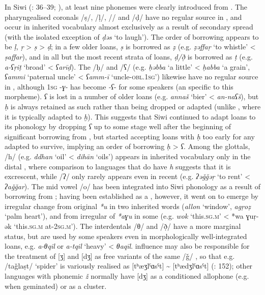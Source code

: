 \documentclass[output=paper]{langsci/langscibook}
\begin{document}
In Siwi (\citealt{Souag2013book}: 36–39; \citealt{SouagvanPutten2016}), at least nine phonemes were clearly introduced from .  The pharyngealised coronals /ṣ/, /ḷ/, /\R/ and /ḍ/ have no regular source in , and occur in inherited vocabulary almost exclusively as a result of secondary  spread (with the isolated exception of \textit{ḍəs} `to laugh').  The order of borrowing appears to be \textit{ḷ,} \textit{ṛ} > \textit{ṣ} > \textit{ḍ}; in a few older loans,  \textit{ṣ} is borrowed as \textit{ẓ} (e.g. \textit{ẓəffaṛ} `to whistle' < \textit{ṣaffar}), and in all but the most recent strata of loans,  \textit{ḍ/ð̣} is borrowed as \textit{ṭ} (e.g. \textit{a-ʕṛiṭ} `broad' < \textit{ʕarīḍ}).  The  /ḥ/ and /ʕ/ (e.g. \textit{ḥəbba} `a little' < \textit{ḥabba} `a grain', \textit{ʕammi} `paternal uncle' < \textit{ʕamm-ī} `uncle-\textsc{obl.1sg}') likewise have no regular source in , although 1\textsc{sg} -\textit{ɣ}{}- has become \textit{{}-ʕ}{}- for some speakers (an  specific to this morpheme). \textit{ʕ} is lost in a number of older loans (e.g. \textit{annaš} `bier' < \textit{an-naʕš}), but \textit{ḥ} is always retained as such rather than being dropped or adapted (unlike , where it is typically adapted to \textit{ḫ}).  This suggests that Siwi continued to adapt  loans to its phonology by dropping \textit{ʕ} up to some stage well after the beginning of significant borrowing from , but started accepting  loans with \textit{ḥ} too early for any adapted to survive, implying an order of borrowing \textit{ḥ} > \textit{ʕ}. Among the glottals, /h/ (e.g. \textit{ddhan} `oil' < \textit{dihān} `oils') appears in inherited vocabulary only in the distal , where comparison to  languages that do have \textit{h} suggests that it is excrescent, while /ʔ/ only rarely appears even in recent  (e.g. \textit{ʔəǧǧəṛ} `to rent' < \textit{ʔaǧǧar}). The mid vowel /o/ has been integrated into Siwi phonology as a result of borrowing from ; having been established as a , however, it went on to emerge by irregular change from original \textit{*u} in two inherited words (\textit{allon} `window', \textit{agṛoẓ} `palm heart'), and from irregular  of \textit{*aɣu} in some  (e.g. \textit{wok} `this\textsc{.sg.m}' < *wa ɣuṛ-ək `this.\textsc{sg.m} at-\textsc{2sg.m')}. The interdentals /θ/ and /ð̣/ have a more marginal status, but are used by some speakers even in morphologically well-integrated loans, e.g. \textit{a-θqil} or \textit{a-tqil} `heavy' < \textit{θaqīl}.  influence may also be responsible for the treatment of [ʒ] and [dʒ] as free variants of the same  /ǧ/ \citep{Vycichl2005}, so that e.g. /taǧlaṣt/ `spider' is variously realised as [tʰæʒlˤɑsˤt] {\textasciitilde} [tʰædʒlˤɑsˤt] (\citealt{Naumann2012}: 152); other  languages with phonemic \textit{ž} normally have [dʒ] as a conditioned allophone (e.g. when geminated) or as a cluster.
\end{document}
